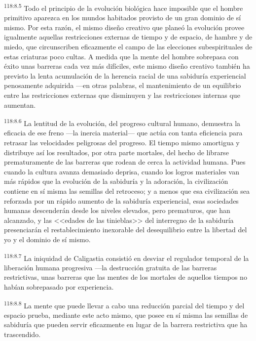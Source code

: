 \par
\textsuperscript{118:8.5} Todo el principio de la evolución biológica hace imposible que el hombre primitivo aparezca en los mundos habitados provisto de un gran dominio de sí mismo. Por esta razón, el mismo diseño creativo que planeó la evolución provee igualmente aquellas restricciones externas de tiempo y de espacio, de hambre y de miedo, que circunscriben eficazmente el campo de las elecciones subespirituales de estas criaturas poco cultas. A medida que la mente del hombre sobrepasa con éxito unas barreras cada vez más difíciles, este mismo diseño creativo también ha previsto la lenta acumulación de la herencia racial de una sabiduría experiencial penosamente adquirida ---en otras palabras, el mantenimiento de un equilibrio entre las restricciones externas que disminuyen y las restricciones internas que aumentan.

\par
\textsuperscript{118:8.6} La lentitud de la evolución, del progreso cultural humano, demuestra la eficacia de ese freno ---la inercia material--- que actúa con tanta eficiencia para retrasar las velocidades peligrosas del progreso. El tiempo mismo amortigua y distribuye así los resultados, por otra parte mortales, del hecho de librarse prematuramente de las barreras que rodean de cerca la actividad humana. Pues cuando la cultura avanza demasiado deprisa, cuando los logros materiales van más rápidos que la evolución de la sabiduría y la adoración, la civilización contiene en sí misma las semillas del retroceso; y a menos que esa civilización sea reforzada por un rápido aumento de la sabiduría experiencial, esas sociedades humanas descenderán desde los niveles elevados, pero prematuros, que han alcanzado, y las <<edades de las tinieblas>> del interregno de la sabiduría presenciarán el restablecimiento inexorable del desequilibrio entre la libertad del yo y el dominio de sí mismo.

\par
\textsuperscript{118:8.7} La iniquidad de Caligastia consistió en desviar el regulador temporal de la liberación humana progresiva ---la destrucción gratuita de las barreras restrictivas, unas barreras que las mentes de los mortales de aquellos tiempos no habían sobrepasado por experiencia.

\par
\textsuperscript{118:8.8} La mente que puede llevar a cabo una reducción parcial del tiempo y del espacio prueba, mediante este acto mismo, que posee en sí misma las semillas de sabiduría que pueden servir eficazmente en lugar de la barrera restrictiva que ha trascendido.

